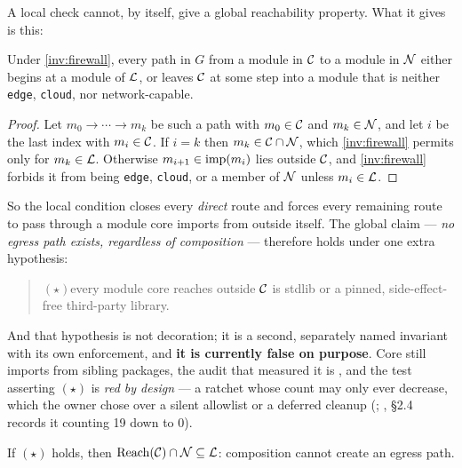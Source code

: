 \noindent A local check cannot, by itself, give a global reachability property. What
it gives is this:

\begin{proposition}
\label{prop:closure}
Under \autoref{inv:firewall}, every path in $G$ from a module in $\mathcal{C}{}$ to a
module in $\mathcal{N}{}$ either begins at a module of $\mathcal{L}{}$, or leaves
$\mathcal{C}{}$ at some step into a module that is neither \texttt{edge},
\texttt{cloud}, nor network-capable.
\end{proposition}

\begin{proof}
Let $m_0 \to \cdots \to m_k$ be such a path with $m_0 \in \mathcal{C}{}$ and
$m_k \in \mathcal{N}{}$, and let $i$ be the last index with $m_i \in \mathcal{C}{}$. If
$i = k$ then $m_k \in \mathcal{C}{} \cap \mathcal{N}{}$, which \autoref{inv:firewall}
permits only for $m_k \in \mathcal{L}{}$. Otherwise $m_{i+1} \in \operatorname{imp}(m_i)$ lies
outside $\mathcal{C}{}$, and \autoref{inv:firewall} forbids it from being
\texttt{edge}, \texttt{cloud}, or a member of $\mathcal{N}{}$ unless
$m_i \in \mathcal{L}{}$.
\end{proof}

\noindent So the local condition closes every \emph{direct} route and forces every
remaining route to pass through a module core imports from outside itself. The
global claim --- \emph{no egress path exists, regardless of composition} --- therefore
holds under one extra hypothesis:

\begin{quote}
$(\star)$\quad every module core reaches outside $\mathcal{C}{}$ is stdlib or a pinned,
side-effect-free third-party library.
\end{quote}

And that hypothesis is not decoration; it is a second, separately named invariant
with its own enforcement, and \textbf{it is currently false on purpose}. Core still
imports from sibling packages, the audit that measured it is
, and the test asserting $(\star)$ is \emph{red by design} ---
a ratchet whose count may only ever decrease, which the owner chose over a silent
allowlist or a deferred cleanup
(;
, \S 2.4 records it counting 19 down to 0).

\begin{proposition}
\label{prop:closure-limit}
If $(\star)$ holds, then
$\operatorname{Reach}(\mathcal{C}{}) \cap \mathcal{N}{} \subseteq \mathcal{L}{}$: composition cannot
create an egress path.
\end{proposition}

